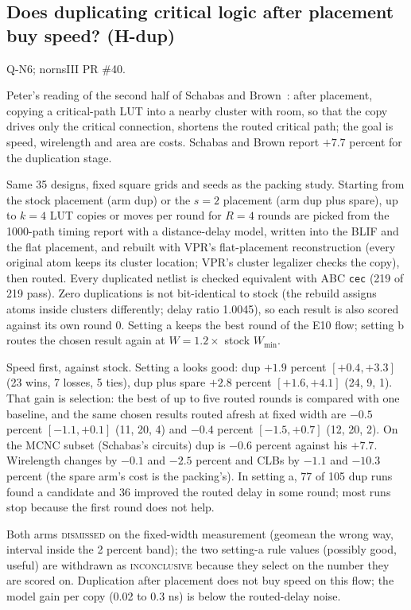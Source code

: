 \subsection{Does duplicating critical logic after placement buy speed? (H-dup)}
\label{sec:e-dup}

 Q-N6; nornsIII PR \#40.

 Peter's reading of the second half of Schabas and Brown~\cite{schabas2003duplication}: after placement, copying a critical-path LUT into a nearby cluster with room, so that the copy drives only the critical connection, shortens the routed critical path; the goal is speed, wirelength and area are costs. Schabas and Brown report $+7.7$ percent for the duplication stage.

 Same 35 designs, fixed square grids and seeds as the packing study. Starting from the stock placement (arm dup) or the $s=2$ placement (arm dup plus spare), up to $k=4$ LUT copies or moves per round for $R=4$ rounds are picked from the 1000-path timing report with a distance-delay model, written into the BLIF and the flat placement, and rebuilt with VPR's flat-placement reconstruction (every original atom keeps its cluster location; VPR's cluster legalizer checks the copy), then routed. Every duplicated netlist is checked equivalent with ABC \texttt{cec} (219 of 219 pass). Zero duplications is not bit-identical to stock (the rebuild assigns atoms inside clusters differently; delay ratio 1.0045), so each result is also scored against its own round 0. Setting a keeps the best round of the E10 flow; setting b routes the chosen result again at $W=1.2\times$ stock $W_{\min}$.

 Speed first, against stock. Setting a looks good: dup $+1.9$ percent $[+0.4,+3.3]$ (23 wins, 7 losses, 5 ties), dup plus spare $+2.8$ percent $[+1.6,+4.1]$ (24, 9, 1). That gain is selection: the best of up to five routed rounds is compared with one baseline, and the same chosen results routed afresh at fixed width are $-0.5$ percent $[-1.1,+0.1]$ (11, 20, 4) and $-0.4$ percent $[-1.5,+0.7]$ (12, 20, 2). On the MCNC subset (Schabas's circuits) dup is $-0.6$ percent against his $+7.7$. Wirelength changes by $-0.1$ and $-2.5$ percent and CLBs by $-1.1$ and $-10.3$ percent (the spare arm's cost is the packing's). In setting a, 77 of 105 dup runs found a candidate and 36 improved the routed delay in some round; most runs stop because the first round does not help.

 Both arms \textsc{dismissed} on the fixed-width measurement (geomean the wrong way, interval inside the 2 percent band); the two setting-a rule values (possibly good, useful) are withdrawn as \textsc{inconclusive} because they select on the number they are scored on. Duplication after placement does not buy speed on this flow; the model gain per copy (0.02 to 0.3 ns) is below the routed-delay noise.

